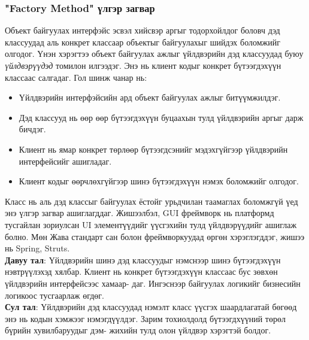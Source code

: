 \subsubsection{"Factory Method" үлгэр загвар}
\quad \quad Объект байгуулах интерфэйс эсвэл хийсвэр аргыг тодорхойлдог боловч дэд классуудад аль конкрет классаар объектыг байгуулахыг шийдэх боломжийг олгодог. Үнэн хэрэгтээ объект байгуулах ажлыг үйлдвэрийн дэд классуудад буюу \textit{үйлдвэрүүдэд} томилон илгээдэг. Энэ нь клиент кодыг конкрет бүтээгдэхүүн классаас салгадаг. Гол шинж чанар нь:
\begin{itemize}
	\item Үйлдвэрийн интерфэйсийн ард объект байгуулах ажлыг битүүмжилдэг.
	\item Дэд классууд нь өөр өөр бүтээгдэхүүн буцаахын тулд үйлдвэрийн аргыг дарж бичдэг.
	\item Клиент нь ямар конкрет төрлөөр бүтээгдсэнийг мэдэхгүйгээр үйлдвэрийн интерфейсийг ашигладаг.
	\item Клиент кодыг өөрчлөхгүйгээр шинэ бүтээгдэхүүн нэмэх боломжийг олгодог.
\end{itemize}
Класс нь аль дэд классыг байгуулах ёстойг урьдчилан таамаглах боломжгүй үед энэ үлгэр загвар ашиглагддаг. Жишээлбэл, GUI фреймворк нь платформд тусгайлан зориулсан UI элементүүдийг үүсгэхийн тулд үйлдвэрүүдийг ашиглаж болно. Мөн Жава стандарт сан болон фреймворкуудад өргөн хэрэглэгддэг, жишээ нь Spring, Struts.\\
\textbf{Давуу тал}: Үйлдвэрийн шинэ дэд классуудыг нэмснээр шинэ бүтээгдэхүүн нэвтрүүлэхэд хялбар. Клиент нь конкрет бүтээгдэхүүн классаас бус зөвхөн үйлдвэрийн интерфейсээс хамаар- даг. Ингэснээр байгуулах логикийг бизнесийн логикоос тусгаарлаж өгдөг.\\
\textbf{Сул тал}: Үйлдвэрийн дэд классуудад нэмэлт класс үүсгэх шаардлагатай бөгөөд энэ нь кодын хэмжээг нэмэгдүүлдэг. Зарим тохиолдолд бүтээгдхүүний төрөл бүрийн хувилбаруудыг дэм- жихийн тулд олон үйлдвэр хэрэгтэй болдог.

